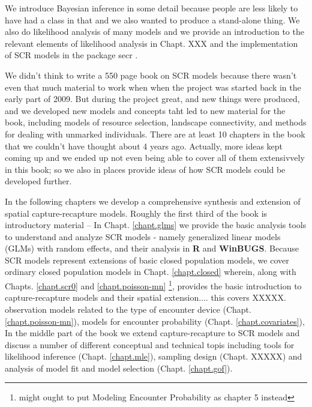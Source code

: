 We introduce Bayesian inference in some
 detail because people are less likely to have had a class in that and
 we also wanted to produce a stand-alone thing.   We also do
 likelihood analysis of many models and we provide an introduction to
 the relevant elements of likelihood analysis in Chapt. XXX and the
 implementation of SCR models in the package secr \citep{efford_etal:2009euring}.


We didn't
think to write a 550 page book on SCR models because there wasn't even
that much material to work when when the project was started back in
the early part of 2009. But during the project great, and new things were
produced, and we developed new models and concepts taht led to new
material for the book, including models of resource selection,
landscape connectivity, and methods for dealing with unmarked
individuals. There are at least 10 chapters in the book that we
couldn't have thought about 4 years ago. Actually, more ideas kept coming up and we ended up not even being able to cover all of them extensivvely in this book; so we also in places provide ideas of how SCR models could be developed further. 

In the following chapters we develop a comprehensive synthesis and extension of
spatial capture-recapture models.
Roughly the first third of the book is introductory material --
In Chapt. \ref{chapt.glms} we provide the basic analysis tools to understand and
analyze SCR models - namely generalized linear models (GLMs) with random effects, and their
analysis in {\bf R} and {\bf WinBUGS}.  Because SCR models represent extensions of
basic closed population models, we cover ordinary closed population
models in Chapt. \ref{chapt.closed} wherein, along with Chapts. \ref{chapt.scr0} and \ref{chapt.poisson-mn}
\footnote{might ought to put Modeling Encounter Probability
  as chapter 5 instead}, provides the basic introduction
to capture-recapture models and their spatial extension.... this
covers XXXXX.
observation models related to the type of encounter device (Chapt. \ref{chapt.poisson-mn}), models for encounter probability
(Chapt. \ref{chapt.covariates}),
In the middle part of the book we extend capture-recapture to SCR models
and discuss a number of different conceptual and technical topis
including 
tools for likelihood inference (Chapt. \ref{chapt.mle}), sampling design
(Chapt. XXXXX) and analysis of model fit and model selection
(Chapt. \ref{chapt.gof}). 

